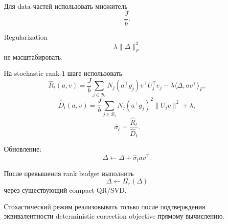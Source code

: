 Для data-частей использовать множитель
\[
    \frac{J}{b}.
\]

Regularization
\[
    \lambda\|\Delta\|_F^2
\]
не масштабировать.

На stochastic rank-$1$ шаге использовать
\[
\widehat R_t(a,v)
=
\frac{J}{b}
\sum_{j\in\mathcal B_t}
N_j
(a^\top g_j)
v^\top U_j^\top e_j
-
\lambda
\langle\Delta,av^\top\rangle_F,
\]
\[
\widehat D_t(a,v)
=
\frac{J}{b}
\sum_{j\in\mathcal B_t}
N_j
(a^\top g_j)^2
\|U_jv\|^2
+
\lambda,
\]
\[
\boxed{
    \widehat\sigma_t
    =
    \frac{\widehat R_t}{\widehat D_t}.
}
\]

Обновление:
\[
    \Delta
    \leftarrow
    \Delta
    +
    \widehat\sigma_tav^\top.
\]

После превышения rank budget выполнить
\[
\boxed{
    \Delta\leftarrow\Pi_r(\Delta)
}
\]
через существующий compact QR/SVD.

Стохастический режим реализовывать только после подтверждения
эквивалентности deterministic correction objective прямому вычислению.
